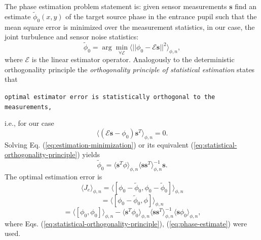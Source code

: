 The phase estimation problem statement is: given sensor measurements $\bm{s}$
find an estimate $\tilde{\phi}_{0}(x,y)$ of the target source phase in the
entrance pupil such
that the mean square error is minimized over the measurement statistics, in
our case, the joint turbulence and sensor noise statistics:
\begin{equation} \label{eq:estimation-minimization}
	\tilde{\phi}_{0} =
	\arg \min_{\forall \mathcal{E}}
	\langle
	||\phi_{0} - \mathcal{E} \bm{s}||^{2}
	\rangle_{\phi,n},
\end{equation}
where $\mathcal{E}$ is the linear estimator operator.
Analogously to the deterministic orthogonality principle the \emph{orthogonality
principle of statistical estimation}  states that
\begin{flushleft}
	\texttt{optimal estimator error is statistically orthogonal to the
	measurements,}
\end{flushleft}
i.e., for our case
\begin{equation} \label{eq:statistical-orthogonality-principle}
	\langle ( \mathcal{E}\bm{s} - \phi_{0} ) \bm{s}^{T} \rangle_{\phi,n} = 0.
\end{equation}
Solving Eq. (\ref{eq:estimation-minimization}) or its equivalent
(\ref{eq:statistical-orthogonality-principle}) yields
\begin{equation} \label{eq:phase-estimate}
	\tilde{\phi}_{0} = \langle \bm{s}^{T} \phi \rangle_{\phi,n}
	                   \langle \bm{s} \bm{s}^{T} \rangle_{\phi,n}^{-1} \bm{s}.
\end{equation}
The optimal estimation error is
\begin{equation} \label{eq:estimation-error}
  \langle J_{e} \rangle_{\phi,n} =
	\langle
	[\phi_{0} - \tilde{\phi}_{0},\phi_{0} - \tilde{\phi}_{0}]
	\rangle_{\phi,n}
\end{equation}
$$
  = \langle [\phi_{0} - \tilde{\phi}_{0},\phi] \rangle_{\phi,n}
$$
$$
  = \langle [\phi_{0},\phi_{0}] \rangle_{\phi,n} -
    \langle \bm{s}^{T} \phi_{0} \rangle_{\phi,n}
	  \langle \bm{ss}^{T} \rangle_{\phi,n}^{-1}
	  \langle \bm{s} \phi_{0} \rangle_{\phi,n},
$$
where Eqs. (\ref{eq:statistical-orthogonality-principle}),
           (\ref{eq:phase-estimate}) were used.

